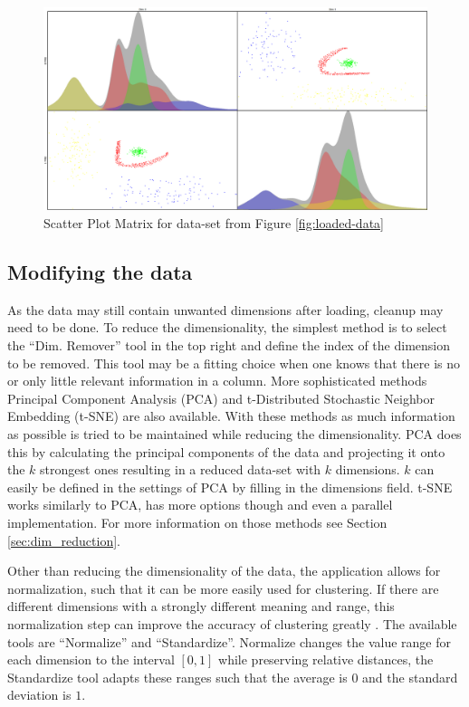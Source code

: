 \documentclass[
	a4paper,
	english,
	twoside,
	openright,               
	11pt                            
	]{report}
\begin{document}
\begin{figure}[h]
	\centering
	\includegraphics[scale=.3]{scatter_matrix}
	\caption{Scatter Plot Matrix for data-set from Figure \ref{fig:loaded-data}}
	\label{fig:scatter_matrix}
\end{figure}

\subsection{Modifying the data}

As the data may still contain unwanted dimensions after loading, cleanup may need to be done. To reduce the dimensionality, the simplest method is to select the ``Dim. Remover'' tool in the top right and define the index of the dimension to be removed. This tool may be a fitting choice when one knows that there is no or only little relevant information in a column. More sophisticated methods Principal Component Analysis (PCA) \cite{pca} and t-Distributed Stochastic Neighbor Embedding (t-SNE) \cite{Maaten2008VisualizingDU} are also available. With these methods as much information as possible is tried to be maintained while reducing the dimensionality. PCA does this by calculating the principal components of the data and projecting it onto the $k$ strongest ones resulting in a reduced data-set with $k$ dimensions. $k$ can easily be defined in the settings of PCA by filling in the dimensions field. t-SNE works similarly to PCA, has more options though and even a parallel implementation. For more information on those methods see Section \ref{sec:dim_reduction}.

Other than reducing the dimensionality of the data, the application allows for normalization, such that it can be more easily used for clustering. If there are different dimensions with a strongly different meaning and range, this normalization step can improve the accuracy of clustering greatly \cite{normalization}. The available tools are ``Normalize'' and ``Standardize''. Normalize changes the value range for each dimension to the interval $[0,1]$ while preserving relative distances, the Standardize tool adapts these ranges such that the average is $0$ and the standard deviation is $1$.
\end{document}
